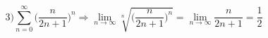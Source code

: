 $$
3) \sum_{n=0}^\infty \Big( \dfrac{n}{2n+1} \Big)^n
\Rightarrow
 \lim_{n \to \infty} \sqrt[n]{\Big( \dfrac{n}{2n+1} \Big)^n}
= \lim_{n \to \infty} \dfrac{n}{2n+1}
= \dfrac{1}{2}
$$


